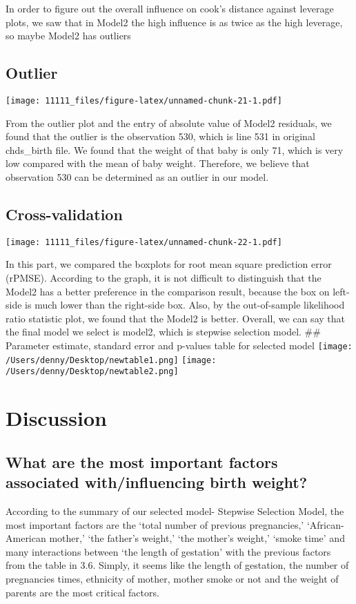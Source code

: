 \documentclass[]{article}
\begin{document}
In order to figure out the overall influence on cook's distance against
leverage plots, we saw that in Model2 the high influence is as twice as
the high leverage, so maybe Model2 has outliers

\subsection{Outlier}\label{outlier}

\texttt{[image: 11111\_files/figure-latex/unnamed-chunk-21-1.pdf]}

From the outlier plot and the entry of absolute value of Model2
residuals, we found that the outlier is the observation 530, which is
line 531 in original chds\_birth file. We found that the weight of that
baby is only 71, which is very low compared with the mean of baby
weight. Therefore, we believe that observation 530 can be determined as
an outlier in our model.

\subsection{Cross-validation}\label{cross-validation}

\texttt{[image: 11111\_files/figure-latex/unnamed-chunk-22-1.pdf]}

In this part, we compared the boxplots for root mean square prediction
error (rPMSE). According to the graph, it is not difficult to
distinguish that the Model2 has a better preference in the comparison
result, because the box on left-side is much lower than the right-side
box. Also, by the out-of-sample likelihood ratio statistic plot, we
found that the Model2 is better. Overall, we can say that the final
model we select is model2, which is stepwise selection model. \#\#
Parameter estimate, standard error and p-values table for selected model
\texttt{[image: /Users/denny/Desktop/newtable1.png]}
\texttt{[image: /Users/denny/Desktop/newtable2.png]}

\section{Discussion}\subsection{What are the most important factors associated with/influencing birth weight?}

According to the summary of our selected model- Stepwise Selection
Model, the most important factors are the `total number of previous
pregnancies,' `African-American mother,' `the father's weight,' `the
mother's weight,' `smoke time' and many interactions between `the length
of gestation' with the previous factors from the table in 3.6. Simply,
it seems like the length of gestation, the number of pregnancies times,
ethnicity of mother, mother smoke or not and the weight of parents are
the most critical factors.
\end{document}
